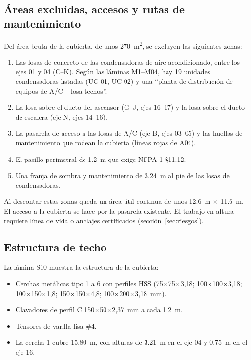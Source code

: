 \documentclass[12pt]{article}
\begin{document}
\subsection{Áreas excluidas, accesos y rutas de mantenimiento}
Del área bruta de la cubierta, de unos \SI{270}{\meter\squared}, se excluyen las siguientes zonas:
\begin{enumerate}[label=(\alph*)]
\item Las losas de concreto de las condensadoras de aire acondicionado, entre los ejes 01 y 04 (C--K). Según las láminas M1--M04, hay 19 unidades condensadoras listadas (UC-01, UC-02) y una ``planta de distribución de equipos de A/C -- losa techos''.
\item La losa sobre el ducto del ascensor (G--J, ejes 16--17) y la losa sobre el ducto de escalera (eje N, ejes 14--16).
\item La pasarela de acceso a las losas de A/C (eje B, ejes 03--05) y las huellas de mantenimiento que rodean la cubierta (líneas rojas de A04).
\item El pasillo perimetral de \SI{1.2}{\meter} que exige NFPA 1 §11.12.
\item Una franja de sombra y mantenimiento de \SI{3.24}{\meter} al pie de las losas de condensadoras.
\end{enumerate}

Al descontar estas zonas queda un área útil continua de unos \SI{12.6}{\meter} $\times$ \SI{11.6}{\meter}. El acceso a la cubierta se hace por la pasarela existente. El trabajo en altura requiere línea de vida o anclajes certificados (sección~\ref{sec:riesgos}).

\subsection{Estructura de techo}
La lámina S10 muestra la estructura de la cubierta:
\begin{itemize}
\item Cerchas metálicas tipo 1 a 6 con perfiles HSS (75$\times$75$\times$3,18; 100$\times$100$\times$3,18; 100$\times$150$\times$1,8; 150$\times$150$\times$4,8; 100$\times$200$\times$3,18~mm).
\item Clavadores de perfil C 150$\times$50$\times$2,37~mm a cada \SI{1.2}{\meter}.
\item Tensores de varilla lisa \#4.
\item La cercha 1 cubre \SI{15.80}{\meter}, con alturas de \SI{3.21}{\meter} en el eje 04 y \SI{0.75}{\meter} en el eje 16.
\end{itemize}
\end{document}
